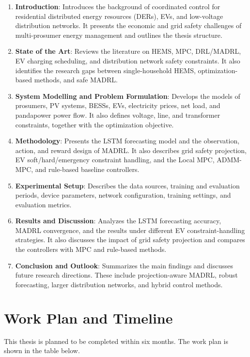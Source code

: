 \documentclass[12pt,a4paper]{ctexart}
\begin{document}
\begin{enumerate}
  \item \textbf{Introduction}: Introduces the background of coordinated control for residential distributed energy resources (DERs), EVs, and low-voltage distribution networks. It presents the economic and grid safety challenges of multi-prosumer energy management and outlines the thesis structure.
  \item \textbf{State of the Art}: Reviews the literature on HEMS, MPC, DRL/MADRL, EV charging scheduling, and distribution network safety constraints. It also identifies the research gaps between single-household HEMS, optimization-based methods, and safe MADRL.
  \item \textbf{System Modelling and Problem Formulation}: Develops the models of prosumers, PV systems, BESSs, EVs, electricity prices, net load, and pandapower power flow. It also defines voltage, line, and transformer constraints, together with the optimization objective.
  \item \textbf{Methodology}: Presents the LSTM forecasting model and the observation, action, and reward design of MADRL. It also describes grid safety projection, EV soft/hard/emergency constraint handling, and the Local MPC, ADMM-MPC, and rule-based baseline controllers.
  \item \textbf{Experimental Setup}: Describes the data sources, training and evaluation periods, device parameters, network configuration, training settings, and evaluation metrics.
  \item \textbf{Results and Discussion}: Analyzes the LSTM forecasting accuracy, MADRL convergence, and the results under different EV constraint-handling strategies. It also discusses the impact of grid safety projection and compares the controllers with MPC and rule-based methods.
  \item \textbf{Conclusion and Outlook}: Summarizes the main findings and discusses future research directions. These include projection-aware MADRL, robust forecasting, larger distribution networks, and hybrid control methods.
\end{enumerate}

\section{Work Plan and Timeline}

This thesis is planned to be completed within six months. The work plan is shown in the table below.
\end{document}
